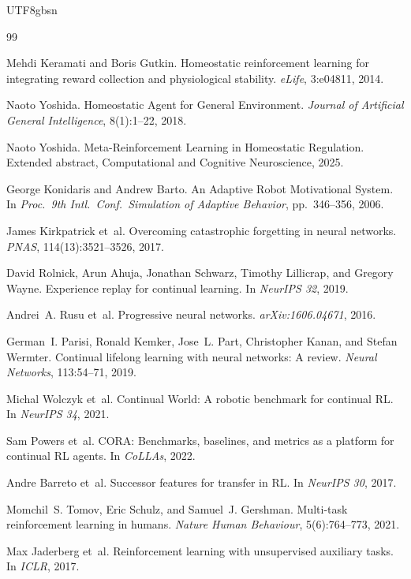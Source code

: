 \documentclass[sigplan,10pt]{acmart}
\begin{document}
\begin{CJK*}{UTF8}{gbsn}

\begin{thebibliography}{99}

Mehdi Keramati and Boris Gutkin.
Homeostatic reinforcement learning for integrating reward collection
  and physiological stability.
\emph{eLife}, 3:e04811, 2014.

Naoto Yoshida.
Homeostatic Agent for General Environment.
\emph{Journal of Artificial General Intelligence}, 8(1):1--22, 2018.

Naoto Yoshida.
Meta-Reinforcement Learning in Homeostatic Regulation.
Extended abstract, Computational and Cognitive Neuroscience, 2025.

George Konidaris and Andrew Barto.
An Adaptive Robot Motivational System.
In \emph{Proc.\ 9th Intl.\ Conf.\ Simulation of Adaptive Behavior},
  pp.\ 346--356, 2006.

James Kirkpatrick et~al.
Overcoming catastrophic forgetting in neural networks.
\emph{PNAS}, 114(13):3521--3526, 2017.

David Rolnick, Arun Ahuja, Jonathan Schwarz, Timothy Lillicrap, and
  Gregory Wayne.
Experience replay for continual learning.
In \emph{NeurIPS 32}, 2019.

Andrei~A. Rusu et~al.
Progressive neural networks.
\emph{arXiv:1606.04671}, 2016.

German~I. Parisi, Ronald Kemker, Jose~L. Part, Christopher Kanan, and
  Stefan Wermter.
Continual lifelong learning with neural networks: A review.
\emph{Neural Networks}, 113:54--71, 2019.

Michal Wolczyk et~al.
Continual World: A robotic benchmark for continual RL.
In \emph{NeurIPS 34}, 2021.

Sam Powers et~al.
CORA: Benchmarks, baselines, and metrics as a platform for continual
  RL agents.
In \emph{CoLLAs}, 2022.

Andre Barreto et~al.
Successor features for transfer in RL.
In \emph{NeurIPS 30}, 2017.

Momchil~S. Tomov, Eric Schulz, and Samuel~J. Gershman.
Multi-task reinforcement learning in humans.
\emph{Nature Human Behaviour}, 5(6):764--773, 2021.

Max Jaderberg et~al.
Reinforcement learning with unsupervised auxiliary tasks.
In \emph{ICLR}, 2017.


\end{thebibliography}
\end{CJK*}
\end{document}
